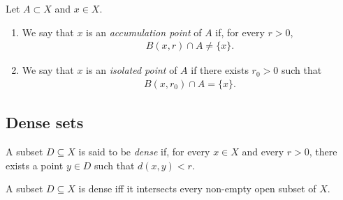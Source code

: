 \documentclass{article}
\begin{document}
\begin{definition}
    Let $A\subset X$ and $x\in X$.
    \begin{enumerate}
        \item We say that $x$ is an \emph{accumulation point} of $A$ if, for every $r>0$,
            \begin{align*}
                B(x,r)\cap A\not=\{x\}.
            \end{align*}
        \item We say that $x$ is an \emph{isolated point} of $A$ if there exists $r_0>0$
            such that \begin{align*}
                B(x,r_0)\cap A = \{x\}.
            \end{align*}
    \end{enumerate} 
\end{definition}

\subsection{Dense sets}

\begin{definition}
    A subset $D\subseteq X$ is said to be \emph{dense} if, for every $x\in X$
    and every $r>0$, there exists a point $y\in D$ such that $d(x,y)<r$.
\end{definition}

\begin{proposition}[Notes 4.33]
    A subset $D\subseteq X$ is dense iff it intersects every non-empty open 
    subset of $X$. 
\end{proposition}
\end{document}
